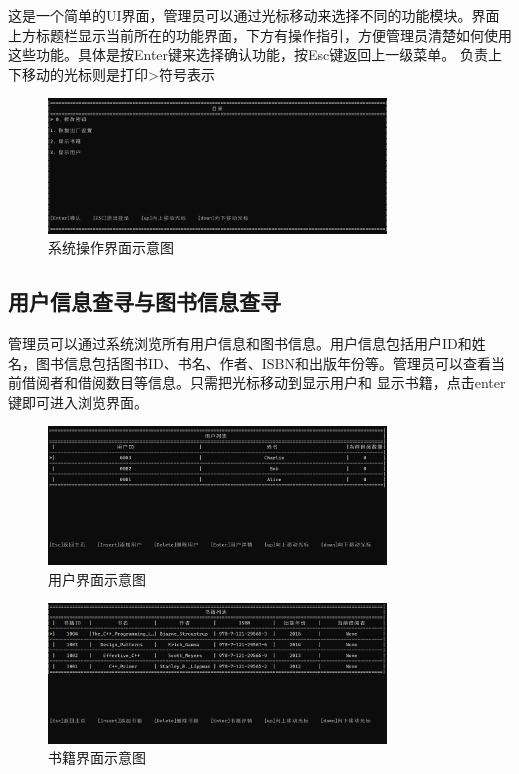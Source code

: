 \documentclass{article}
\begin{document}
这是一个简单的UI界面，管理员可以通过光标移动来选择不同的功能模块。界面上方标题栏显示当前所在的功能界面，下方有操作指引，方便管理员清楚如何使用这些功能。具体是按Enter键来选择确认功能，按Esc键返回上一级菜单。
负责上下移动的光标则是打印>符号表示

\begin{figure}[H]
    \centering
    \includegraphics[width=0.8\textwidth]{system.png}
    \caption{系统操作界面示意图}
\end{figure}

\subsection{用户信息查寻与图书信息查寻}
管理员可以通过系统浏览所有用户信息和图书信息。用户信息包括用户ID和姓名，图书信息包括图书ID、书名、作者、ISBN和出版年份等。管理员可以查看当前借阅者和借阅数目等信息。只需把光标移动到显示用户和
显示书籍，点击enter键即可进入浏览界面。

\begin{figure}[H]
    \centering
    \includegraphics[width=0.8\textwidth]{user.png}
    \caption{用户界面示意图}
\end{figure}

\begin{figure}[H]
    \centering
    \includegraphics[width=0.8\textwidth]{book.png}
    \caption{书籍界面示意图}
\end{figure}
\end{document}
